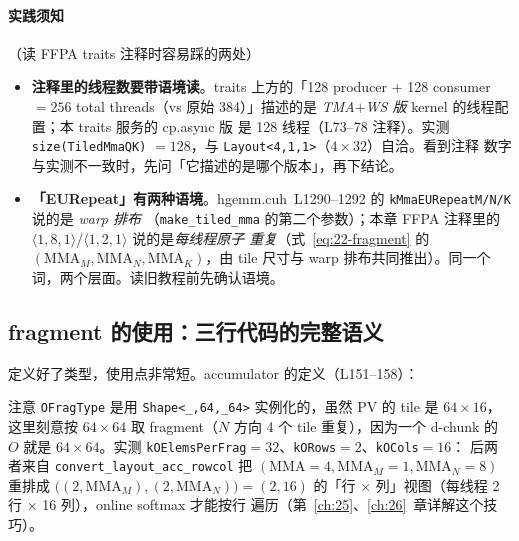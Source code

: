 \paragraph{实践须知}（读 FFPA traits 注释时容易踩的两处）
\begin{itemize}
  \item \textbf{注释里的线程数要带语境读}。traits 上方的「128 producer
        $+$ 128 consumer $= 256$ total threads（vs 原始 384）」描述的是
        \emph{TMA$+$WS 版} kernel 的线程配置；本 traits 服务的 cp.async 版
        是 128 线程（L73--78 注释）。实测 \texttt{size\allowbreak{}(Tiled\allowbreak{}Mma\allowbreak{}QK)}
        $= 128$，与 \texttt{Layout\allowbreak{}<4,\allowbreak{}1,\allowbreak{}1>}（$4\times32$）自洽。看到注释
        数字与实测不一致时，先问「它描述的是哪个版本」，再下结论。
  \item \textbf{「EURepeat」有两种语境}。hgemm.cuh~L1290--1292 的
        \texttt{k\allowbreak{}Mma\allowbreak{}EURepeat\allowbreak{}M/\allowbreak{}N/\allowbreak{}K} 说的是 \emph{warp 排布}
        （\texttt{make\_\allowbreak{}tiled\_\allowbreak{}mma} 的第二个参数）；本章 FFPA 注释里的
        $\langle1,8,1\rangle$/$\langle1,2,1\rangle$ 说的是\emph{每线程原子
        重复}（式~\eqref{eq:22-fragment} 的
        $(\mathrm{MMA}_M,\mathrm{MMA}_N,\mathrm{MMA}_K)$，由 tile 尺寸与
        warp 排布共同推出）。同一个词，两个层面。读旧教程前先确认语境。
\end{itemize}

\subsection{fragment 的使用：三行代码的完整语义}

定义好了类型，使用点非常短。accumulator 的定义（L151--158）：



注意 \texttt{OFragType} 是用 \texttt{Shape\allowbreak{}<\_\allowbreak{},\allowbreak{}64,\allowbreak{}\_\allowbreak{}64>} 实例化的，虽然 PV
的 tile 是 $64\times16$，这里刻意按 $64\times64$ 取 fragment（$N$ 方向 4 个
tile 重复），因为一个 d-chunk 的 $O$ 就是 $64\times64$。实测
\texttt{k\allowbreak{}OElems\allowbreak{}Per\allowbreak{}Frag}$=32$、\texttt{kORows}$=2$、\texttt{kOCols}$=16$：
后两者来自 \texttt{convert\_\allowbreak{}layout\_\allowbreak{}acc\_\allowbreak{}rowcol} 把
$(\mathrm{MMA}=4,\mathrm{MMA}_M=1,\mathrm{MMA}_N=8)$ 重排成
$\bigl((2,\mathrm{MMA}_M),(2,\mathrm{MMA}_N)\bigr) = (2,16)$ 的「行 $\times$
列」视图（每线程 2 行 $\times$ 16 列），online softmax 才能按行
遍历（第~\ref{ch:25}、\ref{ch:26}~章详解这个技巧）。

